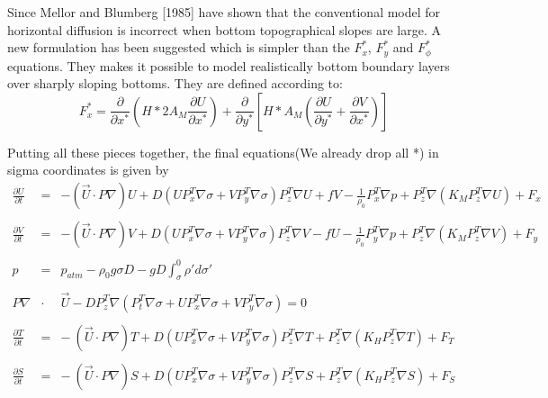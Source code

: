\documentclass[oribibl]{llncs}
\begin{document}
Since Mellor and Blumberg [1985] have shown that the conventional model for horizontal diffusion is incorrect when bottom topographical slopes are large. A new formulation has been suggested which is simpler than the $F^*_x$, $F^*_y$ and $F^*_\phi$ equations. They makes it possible to model realistically bottom boundary layers over sharply sloping bottoms. They are defined according to:
\begin{equation}
F^*_x = \frac{\partial}{\partial x^*} \left (H*2A_M \frac{\partial U}{\partial x^*} \right) + \frac{\partial}{\partial y^*} \left [ H*A_M \left ( \frac{\partial U}{\partial y^*} + \frac{\partial V}{\partial x^*} \right ) \right ]
\end{equation}
\clearpage
\begin{landscape}
Putting all these pieces together, the final equations(We already drop all *) in sigma coordinates is given by
\begin{eqnarray}
\frac{\partial U}{\partial t}&=& -(\vec{U} \cdot P \nabla)U + D \left(UP^T_x \nabla \sigma + VP^T_y \nabla \sigma \right)P^T_z \nabla U + fV - \frac{1}{\rho_0} P^T_x\nabla p + P^T_z\nabla \left ( K_M P^T_z\nabla U\right)+F_x \\ \nonumber \\
\frac{\partial V}{\partial t}&=& -(\vec{U} \cdot P \nabla )V + D \left(UP^T_x \nabla \sigma + VP^T_y \nabla \sigma \right)P^T_z \nabla V  - fU - \frac{1}{\rho_0} P^T_y\nabla p + P^T_z\nabla \left ( K_M P^T_z\nabla V\right)+F_y \\ \nonumber \\
p&=&p_{atm} -\rho_0 g \sigma D - gD \int_\sigma^0 \rho'd \sigma' \\ \nonumber \\
P\nabla  &\cdot  &\vec{U} - D P^T_z \nabla(P^T_t \nabla \sigma + UP^T_x \nabla \sigma + VP^T_y \nabla \sigma)  =0 \\ \nonumber \\
\frac{\partial T}{\partial t}&=&- \ (\vec{U} \cdot P \nabla)T + D \left(UP^T_x \nabla \sigma + VP^T_y \nabla \sigma \right)P^T_z \nabla T + P^T_z\nabla \left ( K_H P^T_z\nabla T \right) + F_T \\ \nonumber \\
\frac{\partial S}{\partial t}&=&- \ (\vec{U} \cdot P \nabla)S + D \left(UP^T_x \nabla \sigma + VP^T_y \nabla \sigma \right)P^T_z \nabla S  + P^T_z\nabla \left ( K_H P^T_z\nabla S \right)  + F_S  \\ \nonumber \\

\end{eqnarray}
\end{landscape}
\end{document}
